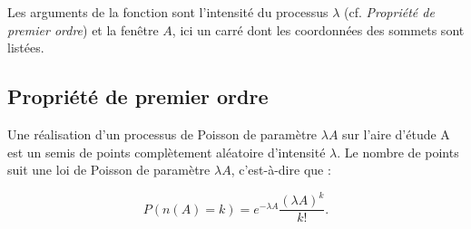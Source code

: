 \documentclass[
  11pt,
  french,
  A4paper,
  extrafontsizes,onecolumn,openright
  ]{memoir}
\theoremstyle{definition}
\theoremstyle{definition}
\theoremstyle{definition}
\theoremstyle{remark}
\begin{document}
Les arguments de la fonction sont l'intensité du processus \(\lambda\)
(cf. \emph{Propriété de premier ordre}) et la fenêtre \(A\), ici un
carré dont les coordonnées des sommets sont listées.

\subsection{Propriété de premier
ordre}\label{propriete-de-premier-ordre-1}

Une réalisation d'un processus de Poisson de paramètre \(\lambda A\) sur
l'aire d'étude A est un semis de points complètement aléatoire
d'intensité \(\lambda\). Le nombre de points suit une loi de Poisson de
paramètre \(\lambda A\), c'est-à-dire que :

\begin{equation}
  P(n(A)=k) = e^{-\lambda A} \frac{(\lambda A)^k}{k!}.
  \label{eq:Poisson}
\end{equation}



\backmatter
\SmallMargins

%
\printbibliography










\evenpage
\SmallMargins
\thispagestyle{empty}
\end{document}

